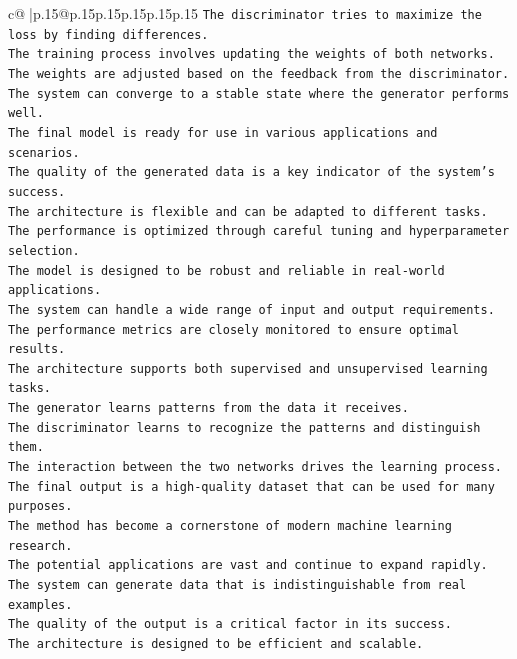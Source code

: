 \documentclass{article}
\begin{document}
{\begin{supertabular}{c@{$\;$}|p{.15\linewidth}@{}p{.15\linewidth}p{.15\linewidth}p{.15\linewidth}p{.15\linewidth}p{.15\linewidth}}
{{{\texttt{The discriminator tries to maximize the loss by finding differences.  } \\
\texttt{The training process involves updating the weights of both networks.  } \\
\texttt{The weights are adjusted based on the feedback from the discriminator.  } \\
\texttt{The system can converge to a stable state where the generator performs well.  } \\
\texttt{The final model is ready for use in various applications and scenarios.  } \\
\texttt{The quality of the generated data is a key indicator of the system's success.  } \\
\texttt{The architecture is flexible and can be adapted to different tasks.  } \\
\texttt{The performance is optimized through careful tuning and hyperparameter selection.  } \\
\texttt{The model is designed to be robust and reliable in real{-}world applications.  } \\
\texttt{The system can handle a wide range of input and output requirements.  } \\
\texttt{The performance metrics are closely monitored to ensure optimal results.  } \\
\texttt{The architecture supports both supervised and unsupervised learning tasks.  } \\
\texttt{The generator learns patterns from the data it receives.  } \\
\texttt{The discriminator learns to recognize the patterns and distinguish them.  } \\
\texttt{The interaction between the two networks drives the learning process.  } \\
\texttt{The final output is a high{-}quality dataset that can be used for many purposes.  } \\
\texttt{The method has become a cornerstone of modern machine learning research.  } \\
\texttt{The potential applications are vast and continue to expand rapidly.  } \\
\texttt{The system can generate data that is indistinguishable from real examples.  } \\
\texttt{The quality of the output is a critical factor in its success.  } \\
\texttt{The architecture is designed to be efficient and scalable.  } \\
}}}
\end{supertabular}}
\end{document}
